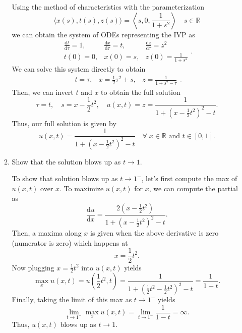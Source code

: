 \documentclass[a4paper,12pt]{article}
\newcommand{\reals}{\mathbb{R}}
\newcommand{\dd}{\mathrm{d}}
\begin{document}
\begin{enumerate}[label = \arabic*.]
\begin{enumerate}[label = (\alph*)]
    		Using the method of characteristics with the parameterization 
    		\[
    			\langle x(s), t(s), z(s) \rangle = \left\langle s, 0, \frac{1}{1 + s^2} \right\rangle \quad s \in \reals
    		\]
    		we can obtain the system of ODEs representing the IVP as
    		\[
	    		\begin{array}{ccc}
	    			\frac{\dd t}{\dd \tau} = 1, & \frac{\dd x}{\dd \tau} = t, & \frac{\dd z}{\dd \tau} = z^2 \\
	    			t(0) = 0, & x(0) = s, & z(0) = \frac{1}{1 + s^2}
	    		\end{array}.
    		\]
    		We can solve this system directly to obtain
    		\[
    			\begin{array}{ccc}
    				t = \tau, & x = \frac{1}{2} \tau^2 + s, & z = \frac{1}{1 + s^2 - \tau}
    			\end{array}.
    		\]
    		Then, we can invert $ t $ and $ x $ to obtain the full solution
    		\[
    			\tau = t, \quad s = x - \frac{1}{2} t^2, \quad u(x,t) = z = \frac{1}{1 + \left(x - \frac{1}{2}t^2\right)^2 - t}.
    		\]
    		Thus, our full solution is given by
    		\[
    			u(x,t) = \frac{1}{1 + \left(x - \frac{1}{2}t^2\right)^2 - t} \quad \forall\; x \in \reals \text{ and } t \in [0, 1].
    		\]
    		
    		\item Show that the solution blows up as $ t \to 1 $.
    		
    		To show that solution blows up as $ t \to 1^{-} $, let's first compute the max of $ u(x,t) $ over $ x $. To maximize $ u(x,t) $ for $ x $, we can compute the partial as
    		\[
    			\frac{\dd u}{\dd x} = \frac{2 \left(x - \frac{1}{2}t^2 \right)}{1 + \left(x - \frac{1}{2}t^2\right)^2 - t}.
    		\]
    		Then, a maxima along $ x $ is given when the above derivative is zero (numerator is zero) which happens at
    		\[
    			x = \frac{1}{2}t^2.
    		\]
    		Now plugging $ x = \frac{1}{2}t^2 $ into $ u(x,t) $ yields
    		\[
    			\max_x u(x,t) = u(\frac{1}{2}t^2, t) = \frac{1}{1 + \left(\frac{1}{2}t^2 - \frac{1}{2}t^2 \right)^2 - t} = \frac{1}{1 - t}.
    		\]
    		Finally, taking the limit of this max as $ t \to 1^{-} $ yields
    		\[
    			\lim_{t \to 1^-} \max_x u(x,t) = \lim_{t \to 1^-} \frac{1}{1 - t} = \infty.
    		\]
    		Thus, $ u(x,t) $ blows up as $ t \to 1 $.
    	\end{enumerate}
\end{enumerate}
\end{document}
